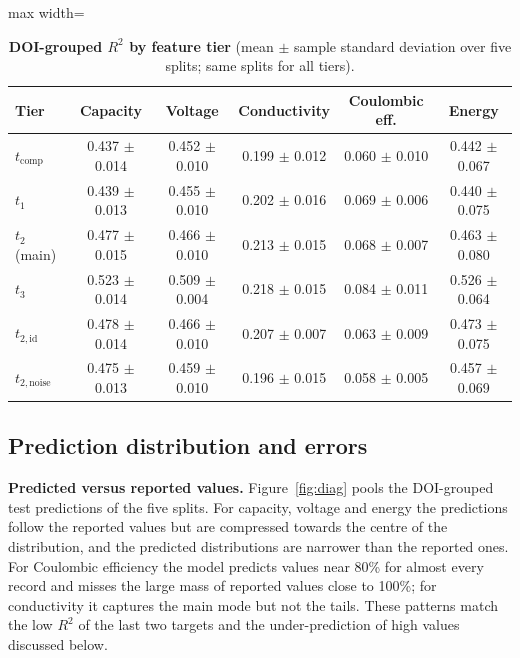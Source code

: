 \documentclass[journal=jcisd8,manuscript=article,layout=traditional]{achemso}
\begin{document}
\begin{table}[htbp]
    \centering\small
    \caption{\textbf{DOI-grouped $R^2$ by feature tier} (mean $\pm$ sample standard deviation over five splits; same splits for all tiers).}
    \label{tab:tiers}
    \begin{adjustbox}{max width=\textwidth}
    \begin{tabular}{@{}lccccc@{}}
        \toprule
        Tier & Capacity & Voltage & Conductivity & Coulombic eff. & Energy \\
        \midrule
        $t_{\mathrm{comp}}$     & 0.437 $\pm$ 0.014 & 0.452 $\pm$ 0.010 & 0.199 $\pm$ 0.012 & 0.060 $\pm$ 0.010 & 0.442 $\pm$ 0.067 \\
        $t_1$                   & 0.439 $\pm$ 0.013 & 0.455 $\pm$ 0.010 & 0.202 $\pm$ 0.016 & 0.069 $\pm$ 0.006 & 0.440 $\pm$ 0.075 \\
        $t_2$ (main)            & 0.477 $\pm$ 0.015 & 0.466 $\pm$ 0.010 & 0.213 $\pm$ 0.015 & 0.068 $\pm$ 0.007 & 0.463 $\pm$ 0.080 \\
        $t_3$                   & 0.523 $\pm$ 0.014 & 0.509 $\pm$ 0.004 & 0.218 $\pm$ 0.015 & 0.084 $\pm$ 0.011 & 0.526 $\pm$ 0.064 \\
        $t_{2,\mathrm{id}}$     & 0.478 $\pm$ 0.014 & 0.466 $\pm$ 0.010 & 0.207 $\pm$ 0.007 & 0.063 $\pm$ 0.009 & 0.473 $\pm$ 0.075 \\
        $t_{2,\mathrm{noise}}$  & 0.475 $\pm$ 0.013 & 0.459 $\pm$ 0.010 & 0.196 $\pm$ 0.015 & 0.058 $\pm$ 0.005 & 0.457 $\pm$ 0.069 \\
        \bottomrule
    \end{tabular}
    \end{adjustbox}
\end{table}



\subsection{Prediction distribution and errors}
\label{sec:prediction_diagnostics}

\textbf{Predicted versus reported values.} Figure~\ref{fig:diag} pools the DOI-grouped test predictions of the five splits. For capacity, voltage and energy the predictions follow the reported values but are compressed towards the centre of the distribution, and the predicted distributions are narrower than the reported ones. For Coulombic efficiency the model predicts values near 80\% for almost every record and misses the large mass of reported values close to 100\%; for conductivity it captures the main mode but not the tails. These patterns match the low $R^2$ of the last two targets and the under-prediction of high values discussed below.
\end{document}

